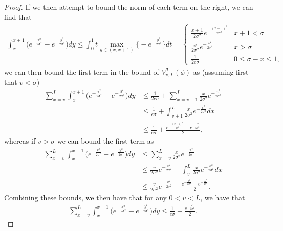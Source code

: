 \documentclass[../thesis-main/thesis-main]{subfiles}
\begin{document}
\begin{proof}
If we then attempt to bound the norm of each term on the right, we can find that
\begin{align}
  \int_{x}^{x+1} \big(e^{-\frac{x^2}{2\sigma^2}} - e^{-\frac{y^2}{2\sigma^2}} \big)dy \leq \int_{0}^{1} t \max_{y\in (x,x+1)}\big\{ -e^{-\frac{y^2}{2\sigma^2}} \big\} dt = \begin{cases}
    \frac{x+1}{2\sigma^2} e^{-\frac{(x+1)^2}{2\sigma^2}} & x+1 < \sigma\\
    \frac{x}{2\sigma^2} e^{-\frac{x^2}{2\sigma^2}} & x> \sigma\\
    \frac{1}{2e\sigma} & 0 \leq \sigma - x \leq 1,
  \end{cases}
\end{align}
we can then bound the first term in the bound of $V_{v,L}^\sigma(\phi)$ as (assuming first that $v<\sigma$)
\begin{align}
  \sum_{x=v}^L \int_{x}^{x+1} \big(e^{-\frac{ x^2}{2\sigma^2}} - e^{-\frac{y^2}{2\sigma^2}} \big)dy &\leq \frac{1}{2e\sigma} + \sum_{x=v+1}^{L} \frac{ x}{2\sigma^2} e^{-\frac{x^2}{2\sigma^2}}\\
  &\leq \frac{1}{e\sigma} + \int_{v+1}^L  \frac{ x}{2\sigma^2} e^{-\frac{x^2}{2\sigma^2}} dx \\
  & \leq \frac{1}{e\sigma} + \frac{e^{-\frac{(v+1)^2}{2\sigma^2}} - e^{-\frac{L^2}{2\sigma^2}}}{2},
\end{align}
whereas if $v>\sigma$ we can bound the first term as
\begin{align}
  \sum_{x=v}^L \int_{x}^{x+1} \big(e^{-\frac{ x^2}{2\sigma^2}} - e^{-\frac{y^2}{2\sigma^2}} \big)dy
   &\leq \sum_{x=v}^L \frac{x}{2\sigma^2} e^{-\frac{x^2}{2\sigma^2}}\\
   &\leq \frac{v}{2\sigma^2} e^{-\frac{v^2}{2\sigma^2}} + \int_{v}^{L} \frac{x}{2\sigma^2} e^{-\frac{x^2}{2\sigma^2}}dx\\
   &\leq  \frac{v}{2\sigma^2} e^{-\frac{v^2}{2\sigma^2}} + \frac{e^{-\frac{v^2}{2\sigma^2}} - e^{-\frac{L^2}{2\sigma^2}}}{2}.
\end{align}
Combining these bounds, we then have that for any $0<v<L$, we have that
\begin{align}
  \sum_{x=v}^L \int_{x}^{x+1}  \big(e^{-\frac{ x^2}{2\sigma^2}} - e^{-\frac{y^2}{2\sigma^2}} \big)dy \leq \frac{1}{e\sigma} + \frac{e^{-\frac{v^2}{2\sigma^2}}}{2}.
\end{align}


\end{proof}
\end{document}
